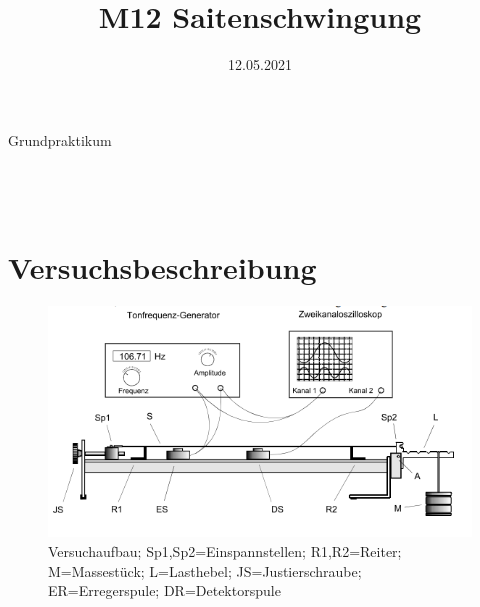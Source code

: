 \documentclass[bibliography=totocnumbered]{scrartcl}
\date{12.05.2021}
\title{M12 Saitenschwingung}
\begin{document}
	\begin{titlepage}
		\begin{center}
			{\huge{Grundpraktikum}}\\\vspace*{15mm}
			{\huge{\textbf{\thetitle}}}\\\vspace*{20mm}
			{\theauthor}\\\vspace*{10mm}
			{\thedate}\\\vspace*{40mm}
			\vspace{1.5cm}
			
			
			
		\end{center}
	\end{titlepage}
	\makeatother
	\restoregeometry
	\newpage
	
	\tableofcontents
	\listoffigures 
	\listoftables
	\newpage
	
	
	
	\section{Versuchsbeschreibung}
	\begin{figure}[H]
	    \centering
	    \includegraphics[width=\linewidth]{fotos/gpr1/M12-Versuchsaufbau.png}
	    \caption{Versuchaufbau; Sp1,Sp2=Einspannstellen; R1,R2=Reiter; M=Massestück; L=Lasthebel; JS=Justierschraube; ER=Erregerspule; DR=Detektorspule}							%
		\label{Abb: Versuchaufb}							%
	\end{figure}
	
\end{document}
